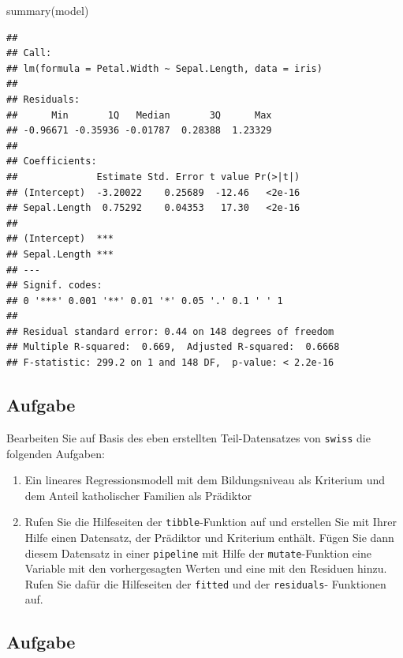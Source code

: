 \documentclass[
]{book}
\newenvironment{Shaded}{\begin{snugshade}}{\end{snugshade}}
\newcommand{\FunctionTok}[1]{\textcolor[rgb]{0.00,0.00,0.00}{#1}}
\newcommand{\NormalTok}[1]{#1}
\begin{document}
\begin{Shaded}
\begin{Highlighting}[]
\FunctionTok{summary}\NormalTok{(model)}
\end{Highlighting}
\end{Shaded}

\begin{verbatim}
## 
## Call:
## lm(formula = Petal.Width ~ Sepal.Length, data = iris)
## 
## Residuals:
##      Min       1Q   Median       3Q      Max 
## -0.96671 -0.35936 -0.01787  0.28388  1.23329 
## 
## Coefficients:
##              Estimate Std. Error t value Pr(>|t|)
## (Intercept)  -3.20022    0.25689  -12.46   <2e-16
## Sepal.Length  0.75292    0.04353   17.30   <2e-16
##                 
## (Intercept)  ***
## Sepal.Length ***
## ---
## Signif. codes:  
## 0 '***' 0.001 '**' 0.01 '*' 0.05 '.' 0.1 ' ' 1
## 
## Residual standard error: 0.44 on 148 degrees of freedom
## Multiple R-squared:  0.669,  Adjusted R-squared:  0.6668 
## F-statistic: 299.2 on 1 and 148 DF,  p-value: < 2.2e-16
\end{verbatim}

\hypertarget{aufgabe-1}{%
\subsection{Aufgabe}\label{aufgabe-1}}

Bearbeiten Sie auf Basis des eben erstellten Teil-Datensatzes von \texttt{swiss} die folgenden Aufgaben:

\begin{enumerate}
\def\labelenumi{\arabic{enumi}.}
\item
  Ein lineares Regressionsmodell mit dem Bildungsniveau als Kriterium und dem Anteil katholischer Familien als Prädiktor
\item
  Rufen Sie die Hilfeseiten der \texttt{tibble}-Funktion auf und erstellen Sie mit Ihrer Hilfe einen Datensatz, der Prädiktor und Kriterium enthält. Fügen Sie dann diesem Datensatz in einer \texttt{pipeline} mit Hilfe der \texttt{mutate}-Funktion eine Variable mit den vorhergesagten Werten und eine mit den Residuen hinzu. Rufen Sie dafür die Hilfeseiten der \texttt{fitted} und der \texttt{residuals}- Funktionen auf.
\end{enumerate}

\hypertarget{aufgabe-2}{%
\subsection{Aufgabe}\label{aufgabe-2}}
\end{document}
